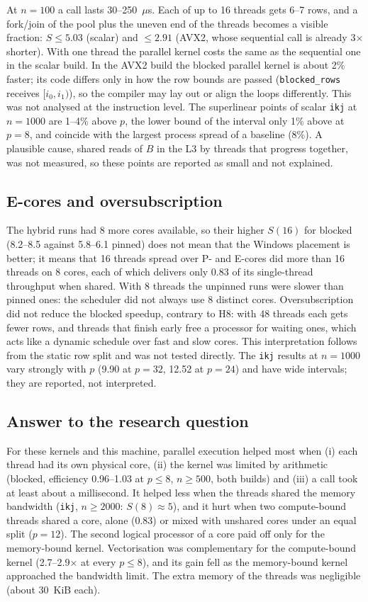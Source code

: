 \documentclass[11pt,a4paper]{article}
\begin{document}
At $n = 100$ a call lasts 30--250~$\mu$s. Each of up to 16 threads gets 6--7 rows, and
a fork/join of the pool plus the uneven end of the threads becomes a visible fraction:
$S \le 5.03$ (scalar) and $\le 2.91$ (AVX2, whose sequential call is already 3$\times$
shorter). With one thread the parallel kernel costs the same as the sequential one in the
scalar build. In the AVX2 build the blocked parallel kernel is about 2\% faster; its code
differs only in how the row bounds are passed (\texttt{blocked\_rows} receives
$[i_0, i_1)$), so the compiler may lay out or align the loops differently. This was not
analysed at the instruction level. The superlinear points of scalar \texttt{ikj} at
$n = 1000$ are 1--4\% above $p$, the lower bound of the interval only 1\% above at
$p = 8$, and coincide with the largest process spread of a baseline (8\%). A plausible
cause, shared reads of $B$ in the L3 by threads that progress together, was not measured,
so these points are reported as small and not explained.

\subsection{E-cores and oversubscription}

The hybrid runs had 8 more cores available, so their higher $S(16)$ for blocked (8.2--8.5
against 5.8--6.1 pinned) does not mean that the Windows placement is better; it means that
16 threads spread over P- and E-cores did more than 16 threads on 8 cores, each of which
delivers only 0.83 of its single-thread throughput when shared. With 8 threads the unpinned runs were slower than pinned ones:
the scheduler did not always use 8 distinct cores. Oversubscription did not reduce the
blocked speedup, contrary to H8: with 48 threads each gets fewer rows, and threads that
finish early free a processor for waiting ones, which acts like a dynamic schedule over
fast and slow cores. This interpretation follows from the static row split and was not
tested directly. The \texttt{ikj} results at $n = 1000$ vary strongly with $p$ (9.90 at
$p = 32$, 12.52 at $p = 24$) and have wide intervals; they are reported, not interpreted.

\subsection{Answer to the research question}

For these kernels and this machine, parallel execution helped most when (i) each thread had
its own physical core, (ii) the kernel was limited by arithmetic (blocked, efficiency
0.96--1.03 at $p \le 8$, $n \ge 500$, both builds) and (iii) a call took at least about a
millisecond. It helped less when the threads shared the memory bandwidth (\texttt{ikj},
$n \ge 2000$: $S(8) \approx 5$), and it hurt when two compute-bound threads shared a core,
alone (0.83) or mixed with unshared cores under an equal split ($p = 12$). The second logical
processor of a core paid off only for the memory-bound kernel. Vectorisation was
complementary for the compute-bound kernel (2.7--2.9$\times$ at every $p \le 8$), and its
gain fell as the memory-bound kernel approached the bandwidth limit. The extra memory of the
threads was negligible (about 30~KiB each).
\end{document}
